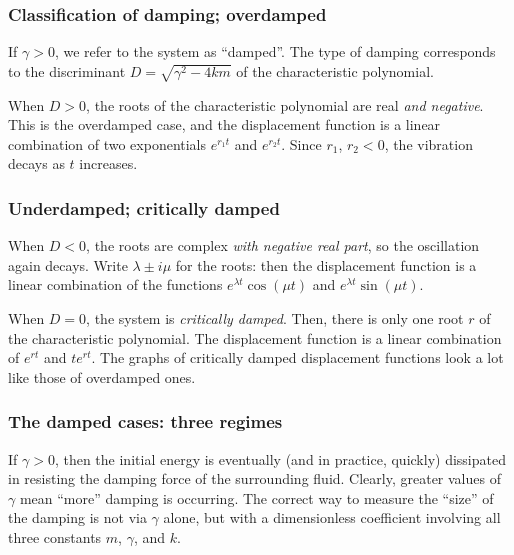 \begin{frame}

\frametitle{Classification of damping; overdamped}
\label{classificationofdampingoverdamped}

If $ \gamma > 0 $, we refer to the system as ``damped''. The type of damping corresponds to the discriminant $ D = \sqrt{\gamma^2 - 4km} $ of the characteristic polynomial.

When $ D > 0 $, the roots of the characteristic polynomial are real \emph{and negative}. This is the overdamped case, and the displacement function is a linear combination of two exponentials $ e^{r_1 t} $ and $ e^{r_2 t} $. Since $ r_1 $, $ r_2 < 0 $, the vibration decays as $ t $ increases.

\end{frame}

\begin{frame}

\frametitle{Underdamped; critically damped}
\label{underdampedcriticallydamped}

When $ D < 0 $, the roots are complex \emph{with negative real part}, so the oscillation again decays. Write $ \lambda \pm i \mu $ for the roots: then the displacement function is a linear combination of the functions $ e^{\lambda t} \cos{(\mu t)} $ and $ e^{\lambda t} \sin{(\mu t)} $.

\pause

When $ D = 0 $, the system is \emph{critically damped}. Then, there is only one root $ r $ of the characteristic polynomial. The displacement function is a linear combination of $ e^{r t} $ and $ te^{rt} $. The graphs of critically damped displacement functions look a lot like those of overdamped ones.

\end{frame}

\begin{frame}

\frametitle{The damped cases: three regimes}
\label{thedampedcases:threeregimes}

If $ \gamma > 0 $, then the initial energy is eventually (and in practice, quickly) dissipated in resisting the damping force of the surrounding fluid. Clearly, greater values of $ \gamma $ mean ``more'' damping is occurring. The correct way to measure the ``size'' of the damping is not via $ \gamma $ alone, but with a dimensionless coefficient involving all three constants $ m $, $ \gamma $, and $ k $.

\end{frame}

